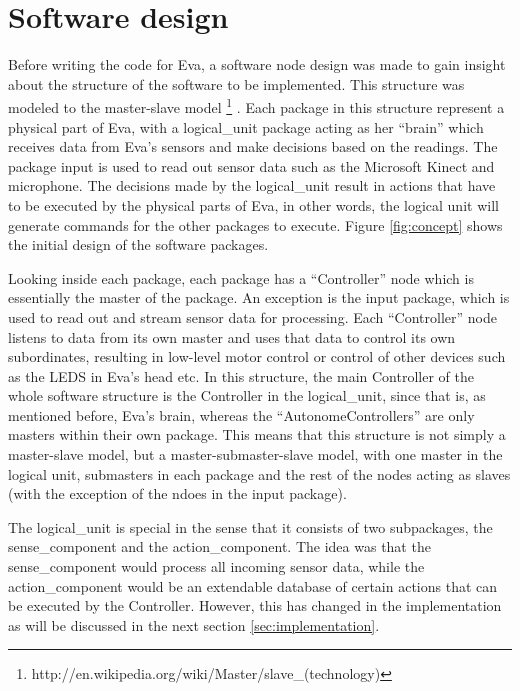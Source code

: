\documentclass[technical_document.tex]{subfiles}
\begin{document}
\section{Software design}
Before writing the code for Eva, a software node design was made to gain insight about the structure of the software to be 
implemented. This structure was modeled to the master-slave model \footnote{http://en.wikipedia.org/wiki/Master/slave\_(technology)} . Each package in this structure represent a physical 
part of Eva, with a logical\_unit package acting as her ``brain'' which receives data from Eva's sensors and make decisions 
based on the readings. The package input is used to read out sensor data such as the Microsoft Kinect and microphone. The 
decisions made by the logical\_unit result in actions that have to be executed by the physical parts of Eva, in other 
words, the logical unit will generate commands for the other packages to execute. Figure \ref{fig:concept} shows the initial design of the software packages.

Looking inside each package, each package has a ``Controller'' node which is essentially the master of the package. An exception is the input package, which is used to read out and stream sensor data for processing. Each ``Controller'' node listens to data from its own master and uses that data to control its own subordinates, resulting in low-level motor control or control of other devices such as the LEDS in Eva's head etc. In this structure, the main Controller of the whole software structure is the Controller in the logical\_unit, since that is, as mentioned before, Eva's brain, whereas the ``AutonomeControllers'' are only masters within their own package. This means that this structure is not simply a master-slave model, but a master-submaster-slave model, with one master in the logical unit, submasters in each package and the rest of the nodes acting as slaves (with the exception of the ndoes in the input package). 

The logical\_unit is special in the sense that it consists of two subpackages, the sense\_component and the action\_component. The idea was that the sense\_component would process all incoming sensor data, while the action\_component would be an extendable database of certain actions that can be executed by the Controller. However, this has changed in the implementation as will be discussed in the next section \ref{sec:implementation}. 
\end{document}
